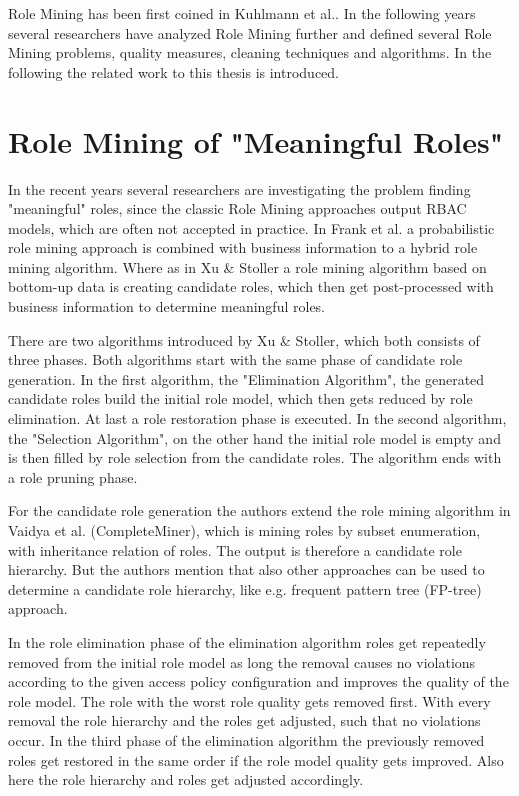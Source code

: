 Role Mining has been first coined in Kuhlmann et al.\cite{Kuhlmann}. In the following years several researchers have analyzed Role Mining further and defined several Role Mining problems, quality measures, cleaning techniques and algorithms. In the following the related work to this thesis is introduced.

\section{Role Mining of "Meaningful Roles"}
\label{sec:relatedWork2}
In the recent years several researchers are investigating the problem finding "meaningful" roles, since the classic Role Mining approaches output RBAC models, which are often not accepted in practice. In Frank et al.\cite{Frank} a probabilistic role mining approach is combined with business information to a hybrid role mining algorithm. Where as in Xu \& Stoller\cite{Xu} a role mining algorithm based on bottom-up data is creating candidate roles, which then get post-processed with business information to determine meaningful roles.

There are two algorithms introduced by Xu \& Stoller\cite{Xu}, which both consists of three phases. Both algorithms start with the same phase of candidate role generation. In the first algorithm, the "Elimination Algorithm", the generated candidate roles build the initial role model, which then gets reduced by role elimination. At last a role restoration phase is executed. In the second algorithm, the "Selection Algorithm", on the other hand the initial role model is empty and is then filled by role selection from the candidate roles. The algorithm ends with a role pruning phase.

For the candidate role generation the authors extend the role mining algorithm in Vaidya et al. (CompleteMiner)\cite{Vaidya:2006:RMR:1180405.1180424}, which is mining roles by subset enumeration, with inheritance relation of roles. The output is therefore a candidate role hierarchy. But the authors mention that also other approaches can be used to determine a candidate role hierarchy, like e.g. frequent pattern tree (FP-tree\cite{Han}) approach.

In the role elimination phase of the elimination algorithm roles get repeatedly removed from the initial role model as long the removal causes no violations according to the given access policy configuration and improves the quality of the role model. The role with the worst role quality gets removed first. With every removal the role hierarchy and the roles get adjusted, such that no violations occur. In the third phase of the elimination algorithm the previously removed roles get restored in the same order if the role model quality gets improved. Also here the role hierarchy and roles get adjusted accordingly.

